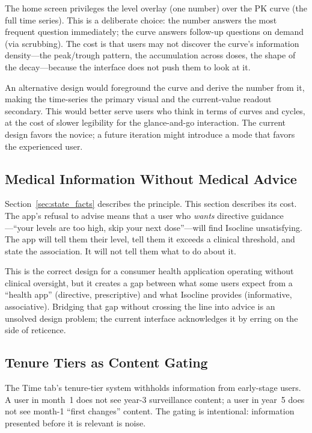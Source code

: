 \documentclass[11pt,a4paper]{article}
\begin{document}
The home screen privileges the level overlay (one number) over the PK
curve (the full time series). This is a deliberate choice: the number
answers the most frequent question immediately; the curve answers
follow-up questions on demand (via scrubbing). The cost is that users may
not discover the curve's information density---the peak/trough pattern,
the accumulation across doses, the shape of the decay---because the
interface does not push them to look at it.

An alternative design would foreground the curve and derive the number
from it, making the time-series the primary visual and the current-value
readout secondary. This would better serve users who think in terms of
curves and cycles, at the cost of slower legibility for the
glance-and-go interaction. The current design favors the novice; a
future iteration might introduce a mode that favors the experienced user.

\subsection{Medical Information Without Medical Advice}
\label{sec:medical_info}

Section~\ref{sec:state_facts} describes the principle. This section
describes its cost. The app's refusal to advise means that a user who
\emph{wants} directive guidance---``your levels are too high, skip your
next dose''---will find Isocline unsatisfying. The app will tell them their
level, tell them it exceeds a clinical threshold, and state the
association. It will not tell them what to do about it.

This is the correct design for a consumer health application operating
without clinical oversight, but it creates a gap between what some users
expect from a ``health app'' (directive, prescriptive) and what Isocline
provides (informative, associative). Bridging that gap without crossing
the line into advice is an unsolved design problem; the current interface
acknowledges it by erring on the side of reticence.

\subsection{Tenure Tiers as Content Gating}
\label{sec:tier_gating}

The Time tab's tenure-tier system withholds information from early-stage
users. A user in month~1 does not see year-3 surveillance content; a user
in year~5 does not see month-1 ``first changes'' content. The gating is
intentional: information presented before it is relevant is noise.
\end{document}
